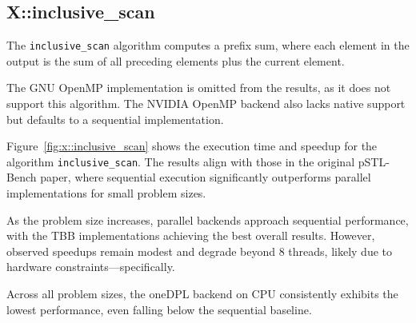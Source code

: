 \documentclass[sigconf]{acmart}
\begin{document}
\subsection{X::inclusive\_scan}

The \texttt{inclusive\_scan} algorithm computes a prefix sum, where each
element in the output is the sum of all preceding elements plus the current
element.

The GNU OpenMP implementation is omitted from the results, as it does not
support this algorithm. The NVIDIA OpenMP backend also lacks native support but
defaults to a sequential implementation.

Figure~\ref{fig:x::inclusive_scan} shows the execution time and speedup for the
algorithm \texttt{inclusive\_scan}. The results align with those in the
original pSTL-Bench paper, where sequential execution significantly outperforms
parallel implementations for small problem sizes.

As the problem size increases, parallel backends approach sequential
performance, with the TBB implementations achieving the best overall results.
However, observed speedups remain modest and degrade beyond 8 threads, likely
due to hardware constraints—specifically.

Across all problem sizes, the oneDPL backend on CPU consistently exhibits the
lowest performance, even falling below the sequential baseline.
\end{document}
